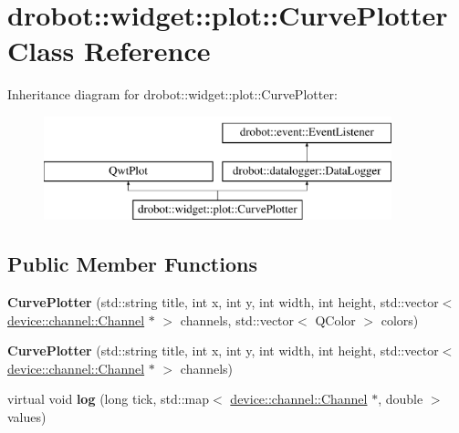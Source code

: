 \hypertarget{classdrobot_1_1widget_1_1plot_1_1CurvePlotter}{\section{drobot\-:\-:widget\-:\-:plot\-:\-:Curve\-Plotter Class Reference}
\label{classdrobot_1_1widget_1_1plot_1_1CurvePlotter}
}
Inheritance diagram for drobot\-:\-:widget\-:\-:plot\-:\-:Curve\-Plotter\-:\begin{figure}[H]
\begin{center}
\leavevmode
\includegraphics[height=3.000000cm]{classdrobot_1_1widget_1_1plot_1_1CurvePlotter}
\end{center}
\end{figure}
\subsection*{Public Member Functions}
\begin{DoxyCompactItemize}
\item 
\hypertarget{classdrobot_1_1widget_1_1plot_1_1CurvePlotter_a06e0e8593cd54792b5a81383b074f8be}{{\bfseries Curve\-Plotter} (std\-::string title, int x, int y, int width, int height, std\-::vector$<$ \hyperlink{classdrobot_1_1device_1_1channel_1_1Channel}{device\-::channel\-::\-Channel} $\ast$ $>$ channels, std\-::vector$<$ Q\-Color $>$ colors)}\label{classdrobot_1_1widget_1_1plot_1_1CurvePlotter_a06e0e8593cd54792b5a81383b074f8be}

\item 
\hypertarget{classdrobot_1_1widget_1_1plot_1_1CurvePlotter_a886c6d8de4ea89742dcfdf55d76f6f29}{{\bfseries Curve\-Plotter} (std\-::string title, int x, int y, int width, int height, std\-::vector$<$ \hyperlink{classdrobot_1_1device_1_1channel_1_1Channel}{device\-::channel\-::\-Channel} $\ast$ $>$ channels)}\label{classdrobot_1_1widget_1_1plot_1_1CurvePlotter_a886c6d8de4ea89742dcfdf55d76f6f29}

\item 
\hypertarget{classdrobot_1_1widget_1_1plot_1_1CurvePlotter_ae81878ae53c9fdf96f5117cb3f640ecf}{virtual void {\bfseries log} (long tick, std\-::map$<$ \hyperlink{classdrobot_1_1device_1_1channel_1_1Channel}{device\-::channel\-::\-Channel} $\ast$, double $>$ values)}\label{classdrobot_1_1widget_1_1plot_1_1CurvePlotter_ae81878ae53c9fdf96f5117cb3f640ecf}

\end{DoxyCompactItemize}

